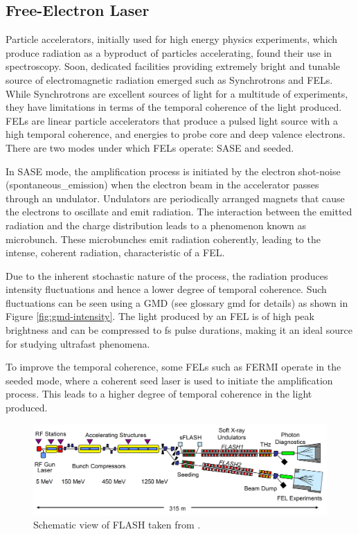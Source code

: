 \subsection*{Free-Electron Laser}
Particle accelerators, initially used for high energy physics experiments, which produce radiation as a byproduct of particles accelerating, found their use in spectroscopy. Soon, dedicated facilities providing extremely bright and tunable source of electromagnetic radiation emerged such as Synchrotrons and \glspl{FEL}.
While Synchrotrons are excellent sources of light for a multitude of experiments, they have limitations in terms of the temporal coherence of the light produced. \Glspl{FEL} are linear particle accelerators that produce a pulsed light source with a high temporal coherence, and energies to probe core and deep valence electrons. There are two modes under which \glspl{FEL} operate: \gls{SASE} and seeded.


In \gls{SASE} mode, the amplification process is initiated by the electron shot-noise (\gls{spontaneous_emission}) when the electron beam in the accelerator passes through an undulator. Undulators are periodically arranged magnets that cause the electrons to oscillate and emit radiation. The interaction between the emitted radiation and the charge distribution leads to a phenomenon known as \gls{microbunch}. These microbunches emit radiation coherently, leading to the intense, coherent radiation, characteristic of a \gls{FEL}. 

Due to the inherent stochastic nature of the process, the radiation produces intensity fluctuations and hence a lower degree of temporal coherence. Such fluctuations can be seen using a \gls{GMD} (see glossary \gls{gmd} for details) as shown in Figure \ref{fig:gmd-intensity}. The light produced by an \gls{FEL} is of high peak brightness and can be compressed to \unit{fs} pulse durations, making it an ideal source for studying ultrafast phenomena.

To improve the temporal coherence, some \glspl{FEL} such as FERMI \cite{svandrlikDevelopmentPerspectivesFERMI2017} operate in the seeded mode, where a coherent seed laser is used to initiate the amplification process. This leads to a higher degree of temporal coherence in the light produced.

\begin{figure}
    \includegraphics[width=1\linewidth]{images/flash_fel.png}
    \caption{Schematic view of \gls{FLASH} taken from \cite{faatzSimultaneousOperationTwo2016}.}
    \label{fig:flash-schematic}
\end{figure}

